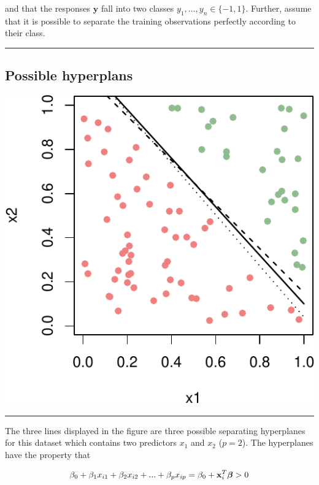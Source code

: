 \documentclass[]{article}
\begin{document}
and that the responses \(\boldsymbol{y}\) fall into two classes
\(y_1,...,y_n \in \{-1,1\}\). Further, assume that it is possible to
separate the training observations perfectly according to their class.

\begin{center}\rule{0.5\linewidth}{\linethickness}\end{center}

\hypertarget{possible-hyperplans}{%
\subsection{Possible hyperplans}\label{possible-hyperplans}}

\includegraphics{9SVM_files/figure-latex/unnamed-chunk-6-1.pdf}

\begin{center}\rule{0.5\linewidth}{\linethickness}\end{center}

The three lines displayed in the figure are three possible separating
hyperplanes for this dataset which contains two predictors \(x_1\) and
\(x_2\) (\(p=2\)). The hyperplanes have the property that

\[\beta_0+\beta_1 x_{i1} + \beta_2 x_{i2}+...+\beta_p x_{ip}=\beta_0+{\bf x}_i^T {\boldsymbol \beta}>0\]
\end{document}

